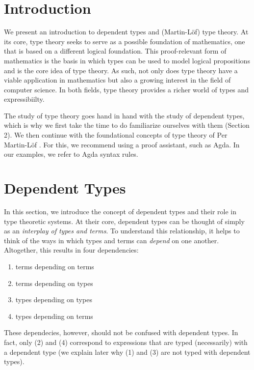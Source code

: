 \documentclass[12pt]{article}
\begin{document}
\maketitle


\section{Introduction}
We present an introduction to dependent types and (Martin-L\"of) type theory.
At its core, type theory seeks to serve as a possible foundation of mathematics,
one that is based on a different logical foundation. This proof-relevant
form of mathematics is the basis in which types can be used to model logical
propositions and is the core idea of type theory. As such, not only does type
theory have a viable application in mathematics but also a growing interest
in the field of computer science. In both fields, type theory provides a richer
world of types and expressibiilty.

The study of type theory goes hand in hand with the study of dependent types,
which is why we first take the time to do familiarize ourselves with them
(Section 2). We then continue with the foundational concepts of type theory of
Per Martin-L\"of \cite{}. For this, we recommend using a proof assistant, such
as Agda. In our examples, we refer to Agda syntax rules. 

\section{Dependent Types}
In this section, we introduce the concept of dependent types and their role in
type theoretic systems. At their core, dependent types can be thought of simply
as an \textit{interplay of types and terms}. To understand this relationship,
it helps to think of the ways in which types and terms can \textit{depend} on
one another. Altogether, this results in four dependencies:

\begin{enumerate}
\item terms depending on terms
\item terms depending on types
\item types depending on types
\item types depending on terms
\end{enumerate}
These dependecies, however, should not be confused with dependent types.
In fact, only (2) and (4) correspond to expressions that are typed (necessarily)
with a dependent type (we explain later why (1) and (3) are not typed with
dependent types).
\end{document}
